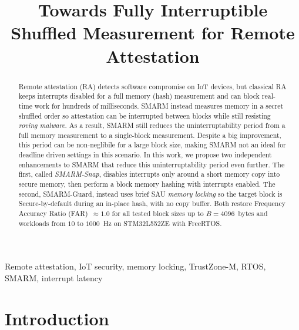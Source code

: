 \documentclass[conference]{IEEEtran}
\newcommand{\smarmcopy}{SMARM-Snap\xspace}
\newcommand{\smarmlock}{SMARM-Guard\xspace}
\begin{document}
\title{Towards Fully Interruptible Shuffled Measurement for Remote Attestation}

\author{
}

\maketitle

\begin{abstract}
Remote attestation (RA) detects software compromise on IoT devices, but
classical RA keeps interrupts disabled for a full memory (hash) measurement and can block real-time work for hundreds of milliseconds.
SMARM instead measures memory in a secret shuffled order so attestation can be interrupted between blocks while still resisting
\emph{roving malware}.
As a result, SMARM still reduces the uninterruptability period from a full memory measurement to a single-block measurement.
Despite a big improvement, this period can be non-neglibile for a large block size, making SMARM not an ideal for deadline driven settings in this scenario. 
In this work, we propose two independent enhancements to SMARM that reduce this uninterruptability period even further.
The first, called \emph{\smarmcopy}, disables interrupts only around a short memory copy into secure memory, then perform a block memory hashing with interrupts enabled.
The second, \smarmlock, instead uses brief SAU \emph{memory locking} so the
target block is Secure-by-default during an in-place hash, with no copy
buffer.
Both restore Frequency Accuracy Ratio
(FAR)~$\approx 1.0$ for all tested block sizes up to $B{=}4096$~bytes
and workloads from $10$ to $1000$~Hz on STM32L552ZE with FreeRTOS.
\end{abstract}

\begin{IEEEkeywords}
Remote attestation, IoT security, memory locking, TrustZone-M, RTOS,
SMARM, interrupt latency
\end{IEEEkeywords}

\section{Introduction}
\label{sec:intro}
\end{document}
